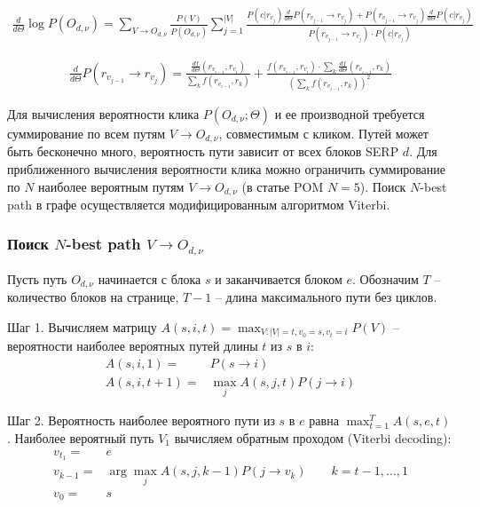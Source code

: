 \documentclass[12pt,a4paper]{article}
\begin{document}
\begin{align}
\frac{d}{d\Theta} \log P(O_{d,\nu}) = \sum_{V \to O_{d,\nu}} \frac{P(V)}{P(O_{d,\nu})}
       \sum_{j=1}^{|V|} \frac{
             P(c | r_{v_j}) \frac{d}{d\Theta} P(r_{v_{j-1}} \to r_{v_j})
               + P(r_{v_{j-1}} \to r_{v_j}) \frac{d}{d\Theta} P(c | r_{v_j})
           }{
             P(r_{v_{j-1}} \to r_{v_j}) \cdot P(c | r_{v_j})
           }
\end{align}

\begin{align}
\frac{d}{d\Theta} P(r_{v_{j-1}} \to r_{v_j}) =
  \frac{ \frac{df}{d\Theta}(r_{v_{i-1}}, r_{v_i}) }{ \sum_k f(r_{v_{i-1}}, r_k) }
    +
  \frac{ f(r_{v_{i-1}}, r_{v_i}) \cdot \sum_k \frac{df}{d\Theta}(r_{v_{i-1}}, r_k) }{
    \left( \sum_k f(r_{v_{i-1}}, r_k) \right)^2
    }
\end{align}

Для вычисления вероятности клика $P(O_{d,\nu}; \Theta)$ и ее производной требуется суммирование по всем путям $V \to O_{d,\nu}$, совместимым с кликом. Путей может быть бесконечно много, вероятность пути зависит от всех блоков SERP $d$. Для приближенного вычисления вероятности клика можно ограничить суммирование по $N$ наиболее вероятным путям $V \to O_{d,\nu}$ (в статье POM $N=5$). Поиск $N$-best path в графе осуществляется модифицированным алгоритмом Viterbi.

\subsubsection{Поиск $N$-best path $V \to O_{d,\nu}$}

Пусть путь $O_{d,\nu}$ начинается с блока $s$ и заканчивается блоком $e$. Обозначим $T$ -- количество блоков на странице, $T-1$ -- длина максимального пути без циклов.

Шаг 1. Вычисляем матрицу $A(s,i,t)=\max_{V: |V|=t, v_0=s, v_t=i} P(V)$ -- вероятности наиболее вероятных путей длины $t$ из $s$ в $i$:
\begin{align*}
A(s,i,1) = & P(s \to i) \\
A(s,i,t+1) = & \max_j A(s,j,t) P(j \to i)
\end{align*}

Шаг 2. Вероятность наиболее вероятного пути из $s$ в $e$ равна $\max_{t=1}^T A(s,e,t)$. Наиболее вероятный путь $V_1$ вычисляем обратным проходом (Viterbi decoding):
\begin{align*}
v_{t_1} =& e \\
v_{k-1} =& \arg\max_j A(s,j,k-1) P(j \to v_k) \qquad k=t-1, \ldots, 1 \\
v_0 =& s
\end{align*}
\end{document}
